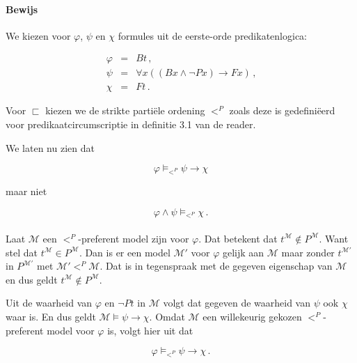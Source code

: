 \documentclass[a4paper,11pt]{article}
\begin{document}
\paragraph{Bewijs}

We kiezen voor $\varphi$, $\psi$ en $\chi$ formules uit de eerste-orde
predikatenlogica:

\begin{eqnarray*}
\varphi & = & Bt \, \mbox{,}\\
\psi    & = & \forall x ((Bx \wedge \neg Px) \rightarrow Fx) \, \mbox{,}\\
\chi    & = & Ft \, \mbox{.}
\end{eqnarray*}

Voor $\sqsubset$ kiezen we de strikte parti\"ele ordening $<^{P}$ zoals deze
is gedefini\"eerd voor predikaatcircumscriptie in definitie 3.1 van de
reader.

We laten nu zien dat

\begin{displaymath}
\varphi \vDash_{<^{P}} \psi \rightarrow \chi
\end{displaymath}

maar niet

\begin{displaymath}
\varphi \wedge \psi \vDash_{<^{P}} \chi \, \mbox{.}
\end{displaymath}

\paragraph{}

Laat $\mathcal{M}$ een $<^{P}$-preferent model zijn voor $\varphi$. Dat
betekent dat $t^{\mathcal{M}} \not \in P^{\mathcal{M}}$. Want stel dat
$t^{\mathcal{M}} \in P^{\mathcal{M}}$. Dan is er een model $\mathcal{M}'$ voor
$\varphi$ gelijk aan $\mathcal{M}$ maar zonder $t^{\mathcal{M}'}$ in
$P^{\mathcal{M}'}$ met $\mathcal{M}' <^{P} \mathcal{M}$. Dat is in tegenspraak
met de gegeven eigenschap van $\mathcal{M}$ en dus geldt $t^{\mathcal{M}} \not
\in P^{\mathcal{M}}$.

Uit de waarheid van $\varphi$ en $\neg Pt$ in $\mathcal{M}$ volgt dat gegeven
de waarheid van $\psi$ ook $\chi$ waar is. En dus geldt $\mathcal{M} \vDash
\psi \rightarrow \chi$. Omdat $\mathcal{M}$ een willekeurig gekozen
$<^{P}$-preferent model voor $\varphi$ is, volgt hier uit dat

\begin{displaymath}
\varphi \vDash_{<^{P}} \psi \rightarrow \chi \, \mbox{.}
\end{displaymath}
\end{document}
